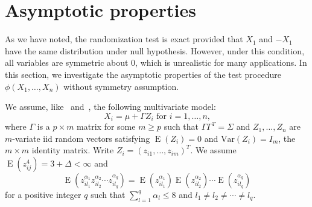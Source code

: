 \documentclass[3p]{elsarticle}
\DeclareMathOperator{\myE}{E}
\theoremstyle{plain}
\theoremstyle{definition}
\theoremstyle{remark}
\begin{document}
%

\section{Asymptotic properties}
As we have noted, the randomization test is exact provided that $X_1$ and $-X_1$ have the same distribution under null hypothesis.
However, under this condition, all variables are symmetric about $0$, which is unrealistic for many applications.
In this section, we investigate the asymptotic properties of the test procedure $\phi(X_1,\ldots,X_n)$ without symmetry assumption.

We assume, like~\citet{Chen2010A} and~\citet{Bai1996Efiect}, the following multivariate model:
\begin{equation}\label{chenC1}
    \textrm{$X_i=\mu+\Gamma Z_i$  for  $i=1,\ldots,n$,}
\end{equation}
where $\Gamma$ is a $p\times m$ matrix for some $m\geq p$ such that $\Gamma\Gamma^T=\Sigma$ and $Z_{1},\ldots, Z_n$ are $m$-variate iid random vectors satisfying $\myE(Z_i)=0$ and $\mathrm{Var}(Z_i)=I_m$, the $m\times m$ identity matrix. Write $Z_i={(z_{i1},\ldots,z_{im})}^T$. We assume $\myE(z_{ij}^4)=3+\Delta<\infty$ and
\begin{equation}\label{chenC2}
    \myE(z_{il_1}^{\alpha_1}z_{il_2}^{\alpha_2}\cdots z_{il_q}^{\alpha_q})=\myE(z_{il_1}^{\alpha_1})\myE(z_{il_2}^{\alpha_2})\cdots \myE(z_{il_q}^{\alpha_q})
\end{equation}
for a positive integer $q$ such that $\sum_{l=1}^q \alpha_l\leq 8$ and $l_1\neq l_2\neq \cdots \neq l_q$.
\end{document}
